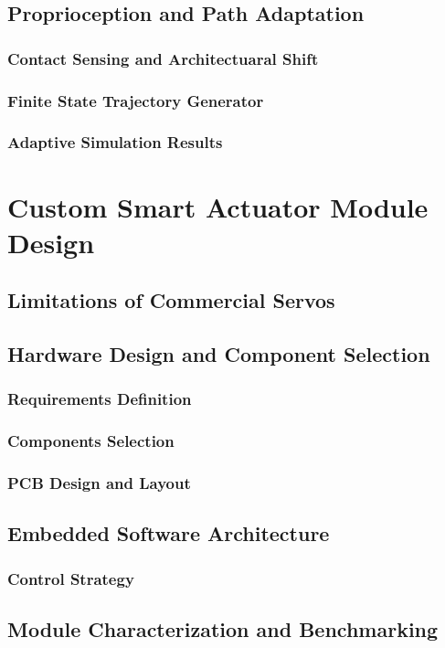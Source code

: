     \section{Proprioception and Path Adaptation}
        \subsection{Contact Sensing and Architectuaral Shift}
        \subsection{Finite State Trajectory Generator}
        \subsection{Adaptive Simulation Results}

\chapter{Custom Smart Actuator Module Design}
    \section{Limitations of Commercial Servos}
    \section{Hardware Design and Component Selection}
        \subsection{Requirements Definition}
        \subsection{Components Selection}
        \subsection{PCB Design and Layout}
    \section{Embedded Software Architecture}
        \subsection{Control Strategy}
    \section{Module Characterization and Benchmarking}
